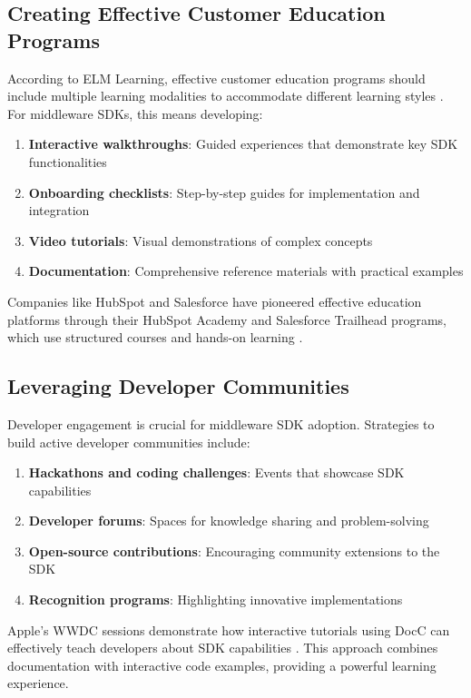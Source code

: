 \documentclass[11pt,a4paper]{article}
\begin{document}
\subsection{Creating Effective Customer Education Programs}

According to ELM Learning, effective customer education programs should include multiple learning modalities to accommodate different learning styles \cite{elm2023}. For middleware SDKs, this means developing:

\begin{enumerate}
    \item \textbf{Interactive walkthroughs}: Guided experiences that demonstrate key SDK functionalities
    \item \textbf{Onboarding checklists}: Step-by-step guides for implementation and integration
    \item \textbf{Video tutorials}: Visual demonstrations of complex concepts
    \item \textbf{Documentation}: Comprehensive reference materials with practical examples
\end{enumerate}

Companies like HubSpot and Salesforce have pioneered effective education platforms through their HubSpot Academy and Salesforce Trailhead programs, which use structured courses and hands-on learning \cite{userpilot2023}.

\subsection{Leveraging Developer Communities}

Developer engagement is crucial for middleware SDK adoption. Strategies to build active developer communities include:

\begin{enumerate}
    \item \textbf{Hackathons and coding challenges}: Events that showcase SDK capabilities
    \item \textbf{Developer forums}: Spaces for knowledge sharing and problem-solving
    \item \textbf{Open-source contributions}: Encouraging community extensions to the SDK
    \item \textbf{Recognition programs}: Highlighting innovative implementations
\end{enumerate}

Apple's WWDC sessions demonstrate how interactive tutorials using DocC can effectively teach developers about SDK capabilities \cite{apple2021}. This approach combines documentation with interactive code examples, providing a powerful learning experience.
\end{document}
